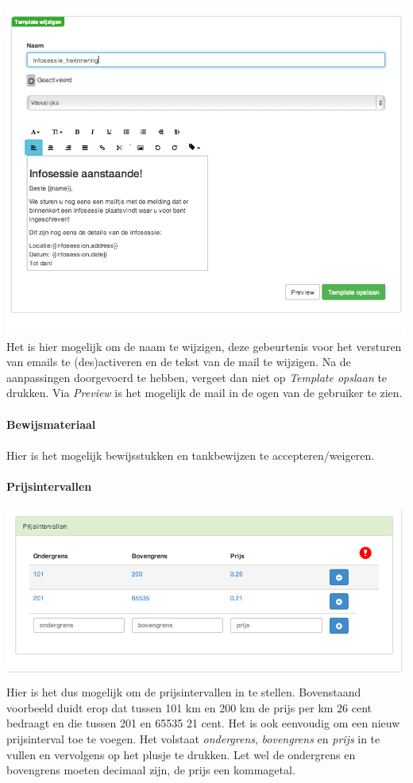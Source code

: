 \documentclass[11pt,a4paper,oneside]{article}
\begin{document}
\includegraphics{templatemails} \\
Het is hier mogelijk om de naam te wijzigen, deze gebeurtenis voor het versturen van emails te (des)activeren en de tekst van de mail te wijzigen. Na de aanpassingen doorgevoerd te hebben, vergeet dan niet op \textit{Template opslaan} te drukken. Via \textit{Preview} is het mogelijk de mail in de ogen van de gebruiker te zien.
\\\\
{\large{\textbf{Bewijsmateriaal}}} \\\\
Hier is het mogelijk bewijsstukken en tankbewijzen te accepteren/weigeren. \\\\
{\large{\textbf{Prijsintervallen}}} \\\\
\includegraphics{prijsintervallen}\\
Hier is het dus mogelijk om de prijsintervallen in te stellen. Bovenstaand voorbeeld duidt erop dat tussen 101 km en 200 km de prijs per km 26 cent bedraagt en die tussen 201 en 65535 21 cent. Het is ook eenvoudig om een nieuw prijsinterval toe te voegen. Het volstaat \textit{ondergrens}, \textit{bovengrens} en \textit{prijs} in te vullen en vervolgens op het plusje te drukken. Let wel de ondergrens en bovengrens moeten decimaal zijn, de prijs een kommagetal.\\\\
\end{document}
